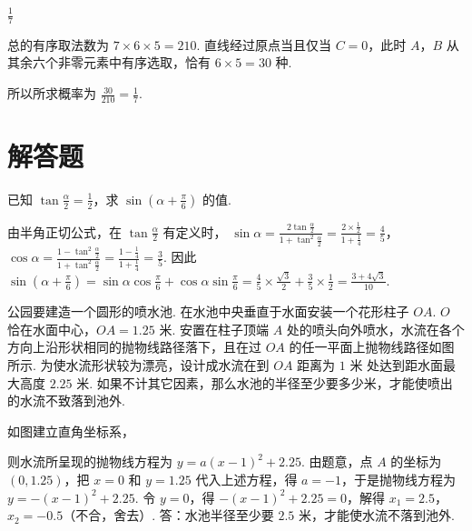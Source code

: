 \documentclass[UTF8,a4paper,oneside,11pt]{ctexbook}
\begin{document}
\begin{answer}
\(\frac{1}{7}\)
\end{answer}

\begin{solution}
总的有序取法数为 \(7\times6\times5=210\). 直线经过原点当且仅当 \(C=0\)，此时 \(A\)，\(B\) 从其余六个非零元素中有序选取，恰有 \(6\times5=30\) 种.

所以所求概率为 \(\frac{30}{210}=\frac17\).
\end{solution}

\section{解答题}

\begin{problem}
已知 \(\tan \frac{\alpha}{2}=\frac{1}{2}\)，求 \(\sin \left(\alpha+\frac{\pi}{6}\right)\) 的值.
\end{problem}

\begin{solution}
由半角正切公式，在 \(\tan\frac{\alpha}{2}\) 有定义时，
\(\sin\alpha=\frac{2\tan\frac{\alpha}{2}}{1+\tan^2\frac{\alpha}{2}}=\frac{2\times\frac12}{1+\frac14}=\frac45\)，
\(\cos\alpha=\frac{1-\tan^2\frac{\alpha}{2}}{1+\tan^2\frac{\alpha}{2}}=\frac{1-\frac14}{1+\frac14}=\frac35\). 因此
\(\sin\left(\alpha+\frac\pi6\right)=\sin\alpha\cos\frac\pi6+\cos\alpha\sin\frac\pi6=\frac45\times\frac{\sqrt3}{2}+\frac35\times\frac12=\frac{3+4\sqrt3}{10}\).
\end{solution}

\begin{problem}
公园要建造一个圆形的喷水池. 在水池中央垂直于水面安装一个花形柱子 \(OA\). \(O\) 恰在水面中心，\(OA=1.25\text{ 米}\). 安置在柱子顶端 \(A\) 处的喷头向外喷水，水流在各个方向上沿形状相同的抛物线路径落下，且在过 \(OA\) 的任一平面上抛物线路径如图所示. 为使水流形状较为漂亮，设计成水流在到 \(OA\) 距离为 \(1\text{ 米}\) 处达到距水面最大高度 \(2.25\text{ 米}\). 如果不计其它因素，那么水池的半径至少要多少米，才能使喷出的水流不致落到池外.

\end{problem}

\begin{solution}
如图建立直角坐标系，


则水流所呈现的抛物线方程为 \(y=a(x-1)^2+2.25\). 由题意，点 \(A\) 的坐标为 \((0,1.25)\)，把 \(x=0\) 和 \(y=1.25\) 代入上述方程，得 \(a=-1\)，于是抛物线方程为 \(y=-(x-1)^2+2.25\). 令 \(y=0\)，得 \(-(x-1)^2+2.25=0\)，解得 \(x_1=2.5\)，\(x_2=-0.5\)（不合，舍去）. 答：水池半径至少要 \(2.5\text{ 米}\)，才能使水流不落到池外.
\end{solution}
\end{document}
